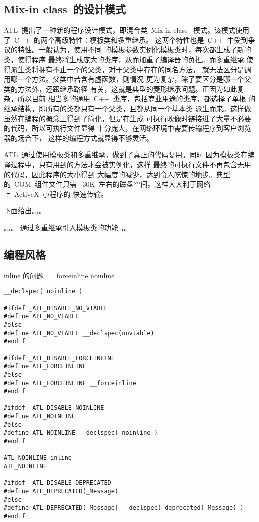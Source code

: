 \subsection{Mix-in class~的设计模式}

ATL~提出了一种新的程序设计模式，即混合类~Mix-in class~
模式。该模式使用了~C++~的两个高级特性：模板类和多重继承。
这两个特性也是~C++~中受到争议的特性。一般认为，使用不同
的模板参数实例化模板类时，每次都生成了新的类，使得程序
最终将生成庞大的类库，从而加重了编译器的负担。而多重继承
使得派生类将拥有不止一个的父类，对于父类中存在的同名方法，
就无法区分是调用哪一个方法。父类中若含有虚函数，则情况
更为复杂，除了要区分是哪一个父类的方法外，还跟继承路径
有关，这就是典型的菱形继承问题。正因为如此复杂，所以目前
相当多的通用~C++~类库，包括商业用途的类库，都选择了单根
的继承结构，即所有的类都只有一个父类，且都从同一个基本类
派生而来。这样做虽然在编程的概念上得到了简化，但是在生成
可执行映像时链接进了大量不必要的代码，所以可执行文件显得
十分庞大，在网络环境中需要传输程序到客户浏览器的场合下，
这样的编程方式就显得不够灵活。

ATL~通过使用模板类和多重继承，做到了真正的代码复用。同时
因为模板类在编译过程中，只有用到的方法才会被实例化，这样
最终的可执行文件不再包含无用的代码，因此程序的大小得到
大幅度的减少，达到令人吃惊的地步。典型的~COM~组件文件只需
~30K~左右的磁盘空间。这样大大利于网络上~ActiveX~小程序的
快速传输。

下面给出。。。

。。。
通过多重继承引入模板类的功能
。。



\subsection{编程风格}

inline 的问题 \_\_forceinline noinline

\ttfamily
\begin{lstlisting}
__declspec( noinline )

#ifdef _ATL_DISABLE_NO_VTABLE
#define ATL_NO_VTABLE
#else
#define ATL_NO_VTABLE __declspec(novtable)
#endif

#ifdef _ATL_DISABLE_FORCEINLINE
#define ATL_FORCEINLINE
#else
#define ATL_FORCEINLINE __forceinline
#endif

#ifdef _ATL_DISABLE_NOINLINE
#define ATL_NOINLINE
#else
#define ATL_NOINLINE __declspec( noinline )
#endif

ATL_NOINLINE inline
ATL_NOINLINE

#ifdef _ATL_DISABLE_DEPRECATED
#define ATL_DEPRECATED(_Message)
#else
#define ATL_DEPRECATED(_Message) __declspec( deprecated(_Message) )
#endif
\end{lstlisting}

